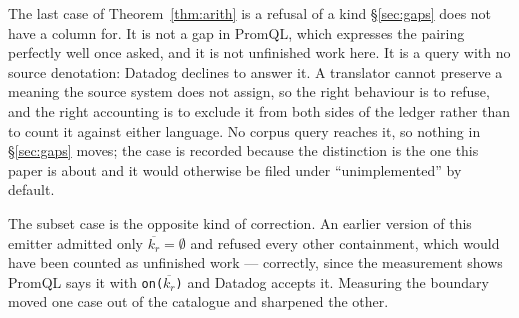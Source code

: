 \begin{remark}\label{rem:third-refusal}
The last case of Theorem~\ref{thm:arith} is a refusal of a kind \S\ref{sec:gaps} does not
have a column for. It is not a gap in PromQL, which expresses the pairing perfectly well
once asked, and it is not unfinished work here. It is a query with no source denotation:
Datadog declines to answer it. A translator cannot preserve a meaning the source system
does not assign, so the right behaviour is to refuse, and the right accounting is to
exclude it from both sides of the ledger rather than to count it against either language.
No corpus query reaches it, so nothing in \S\ref{sec:gaps} moves; the case is recorded
because the distinction is the one this paper is about and it would otherwise be filed
under ``unimplemented'' by default.

The subset case is the opposite kind of correction. An earlier version of this emitter
admitted only $\overline{k_r}=\emptyset$ and refused every other containment, which would
have been counted as unfinished work --- correctly, since the measurement shows PromQL
says it with \texttt{on($\overline{k_r}$)} and Datadog accepts it. Measuring the boundary
moved one case out of the catalogue and sharpened the other.
\end{remark}
